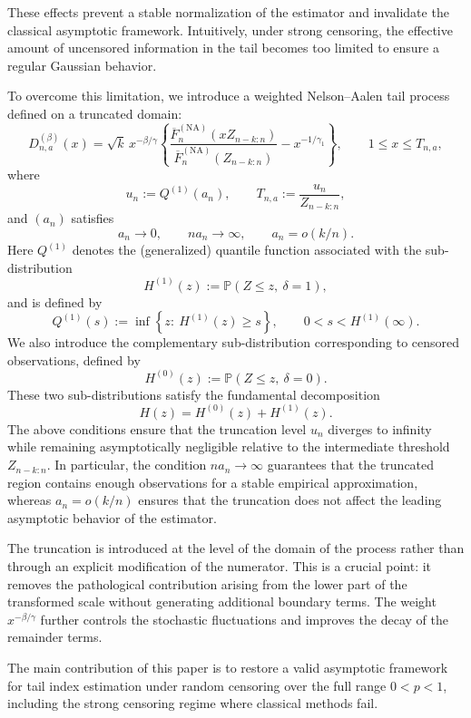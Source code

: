 \documentclass[reqno,openbib,runningheads,a4paper,12pt]{amsart}%
\begin{document}
\noindent These effects prevent a stable normalization of the estimator and
invalidate the classical asymptotic framework. Intuitively, under strong
censoring, the effective amount of uncensored information in the tail becomes
too limited to ensure a regular Gaussian behavior.\smallskip

\noindent To overcome this limitation, we introduce a weighted Nelson--Aalen
tail process defined on a truncated domain:
\[
D_{n,a}^{(\beta)}(x)=\sqrt{k}\,x^{-\beta/\gamma}\left\{  \frac{\overline
{F}_{n}^{(\mathrm{NA})}(xZ_{n-k:n})}{\overline{F}_{n}^{(\mathrm{NA}%
)}(Z_{n-k:n})}-x^{-1/\gamma_{1}}\right\}  ,\qquad1\leq x\leq T_{n,a},
\]
where
\[
u_{n}:=Q^{(1)}(a_{n}),\qquad T_{n,a}:=\frac{u_{n}}{Z_{n-k:n}},
\]
and $(a_{n})$ satisfies
\begin{equation}
a_{n}\rightarrow0,\qquad na_{n}\rightarrow\infty,\qquad a_{n}=o(k/n).
\label{assump_an}%
\end{equation}
Here $Q^{(1)}$ denotes the (generalized) quantile function associated with the
sub-distribution
\[
H^{(1)}(z):=\mathbb{P}(Z\leq z,\ \delta=1),
\]
and is defined by
\[
Q^{(1)}(s):=\inf\left\{  z:\ H^{(1)}(z)\geq s\right\}  ,\qquad0<s<H^{(1)}%
(\infty).
\]
\noindent We also introduce the complementary sub-distribution corresponding
to censored observations, defined by
\[
H^{(0)}(z):=\mathbb{P}(Z\leq z,\ \delta=0).
\]
These two sub-distributions satisfy the fundamental decomposition
\[
H(z)=H^{(0)}(z)+H^{(1)}(z).
\]
The above conditions ensure that the truncation level $u_{n}$ diverges to
infinity while remaining asymptotically negligible relative to the
intermediate threshold $Z_{n-k:n}$. In particular, the condition
$na_{n}\rightarrow\infty$ guarantees that the truncated region contains enough
observations for a stable empirical approximation, whereas $a_{n}=o(k/n)$
ensures that the truncation does not affect the leading asymptotic behavior of
the estimator.\smallskip

\noindent The truncation is introduced at the level of the domain of the
process rather than through an explicit modification of the numerator. This is
a crucial point: it removes the pathological contribution arising from the
lower part of the transformed scale without generating additional boundary
terms. The weight $x^{-\beta/\gamma}$ further controls the stochastic
fluctuations and improves the decay of the remainder terms.\smallskip

\noindent The main contribution of this paper is to restore a valid asymptotic
framework for tail index estimation under random censoring over the full range
$0<p<1$, including the strong censoring regime where classical methods
fail.\smallskip
\end{document}
